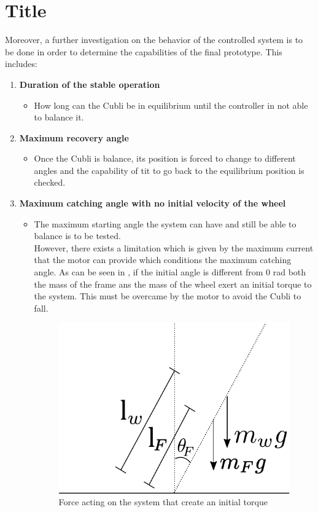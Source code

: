 \section{Title}\label{title}
Moreover, a further investigation on the behavior of the controlled system is to be done in order to determine the capabilities of the final prototype. This includes:
\begin{enumerate}
\item \textbf{Duration of the stable operation}
	\begin{itemize}
	\item[] How long can the Cubli be in equilibrium until the controller in not able to balance it.
	\end{itemize}

	\item \textbf{Maximum recovery angle}
	\begin{itemize}
		\item[] Once the Cubli is balance, its position is forced to change to different angles and the capability of tit to go back to the equilibrium position is checked. 
	\end{itemize}
	
	\item \textbf{Maximum catching angle with no initial velocity of the wheel}
	\begin{itemize}
		\item[] The maximum starting angle the system can have and still be able to balance is to be tested.\\
		However, there exists a limitation which is given by the maximum current that the motor can provide which conditions the maximum catching angle. As can be seen in , if the initial angle is different from 0 rad both the mass of the frame ans the mass of the wheel exert an initial torque to the system. This must be overcame by the motor to avoid the Cubli to fall.
		\begin{figure}[H] 
			\centering
			\includegraphics[scale=0.55]{figures/limitationTorque}
			\caption{Force acting on the system that create an initial torque}
			\label{limitationTorque}
		\end{figure}
		

\end{itemize}
\end{enumerate}
